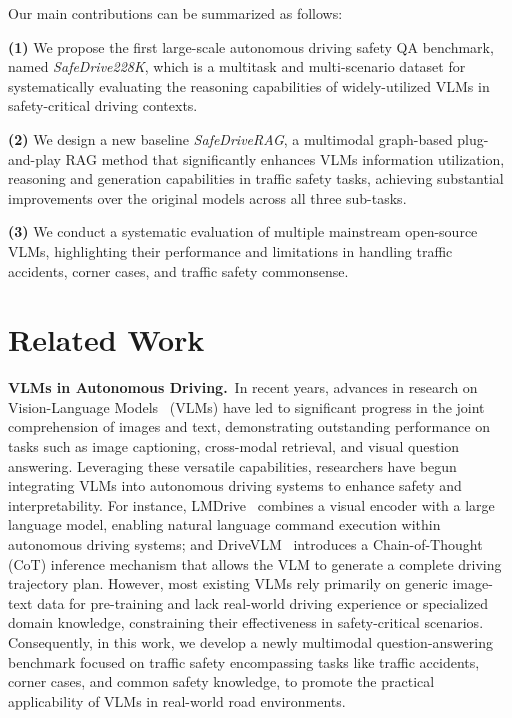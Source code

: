 \documentclass[sigconf]{acmart}
\begin{document}
Our main contributions can be summarized as follows:

\par\textbf{(1)}  We propose the first large-scale autonomous driving safety QA benchmark, named \emph{SafeDrive228K}, which is a multitask and multi-scenario dataset for systematically evaluating the reasoning capabilities of widely-utilized VLMs in safety-critical driving contexts.

\par\textbf{(2)}  We design a new baseline \emph{SafeDriveRAG}, a multimodal graph-based plug-and-play RAG method that significantly enhances VLMs information utilization, reasoning and generation capabilities in traffic safety tasks, achieving substantial improvements over the original models across all three sub-tasks.

\par\textbf{(3)}  We conduct a systematic evaluation of multiple mainstream open-source VLMs, highlighting their performance and limitations in handling traffic accidents, corner cases, and traffic safety commonsense.


\section{Related Work}

\noindent\textbf{VLMs in Autonomous Driving.}~In recent years, advances in research on Vision-Language Models~\cite{openai2024gpt4,qwen2vl2024,8953263,yu2024rlaif, mao2024language,lv2024sgformer, gopalkrishnan2024multi} (VLMs) have led to significant progress in the joint comprehension of images and text, demonstrating outstanding performance on tasks such as image captioning, cross-modal retrieval, and visual question answering. Leveraging these versatile capabilities, researchers have begun integrating VLMs into autonomous driving systems to enhance safety and interpretability. For instance, LMDrive~\cite{shao2024lmdrive}  combines a visual encoder with a large language model, enabling natural language command execution within autonomous driving systems; 
and DriveVLM~\cite{tian2024drivevlm} introduces a Chain-of-Thought~\cite{wei2022chain} (CoT) inference mechanism that allows the VLM to generate a complete driving trajectory plan. However, most existing VLMs rely primarily on generic image-text data for pre-training and lack real-world driving experience or specialized domain knowledge, constraining their effectiveness in safety-critical scenarios. Consequently, in this work, we develop a newly multimodal question-answering benchmark focused on traffic safety encompassing tasks like traffic accidents, corner cases, and common safety knowledge, to promote the practical applicability of VLMs in real-world road environments.
\end{document}

